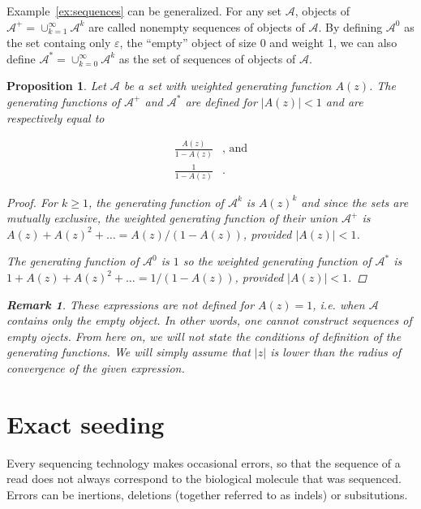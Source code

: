 \documentclass{article}
\newtheorem{proposition}{Proposition}
\newtheorem{remark}{Remark}
\begin{document}
Example~\ref{ex:sequences} can be generalized. For any set $\mathcal{A}$,
objects of $\mathcal{A}^+ = \cup_{k=1}^\infty\mathcal{A}^k$ are called
nonempty sequences of objects of $\mathcal{A}$. By defining
$\mathcal{A}^0$ as the set containg only $\varepsilon$, the ``empty''
object of size 0 and weight 1, we can also define $\mathcal{A}^* =
\cup_{k=0}^\infty\mathcal{A}^k$ as the set of sequences of objects of
$\mathcal{A}$.

\begin{proposition}
Let $\mathcal{A}$ be a set with weighted generating function $A(z)$. The
generating functions of $\mathcal{A}^+$ and $\mathcal{A}^*$ are defined
for $|A(z)| < 1$ and are respectively equal to

\begin{equation*}
\begin{split}
\frac{A(z)}{1-A(z)}&\text{, and} \\
\frac{1}{1-A(z)}&.
\end{split}
\end{equation*}

\begin{proof}
For $k \geq 1$, the generating function of $\mathcal{A}^k$ is $A(z)^k$ and
since the sets are mutually exclusive, the weighted generating function of
their union $\mathcal{A}^+$ is $A(z) + A(z)^2 + \ldots = A(z) / (1-A(z))$,
provided $|A(z)| < 1$.

The generating function of $\mathcal{A}^0$ is $1$ so the weighted
generating function of $\mathcal{A}^*$ is $1 + A(z) + A(z)^2 + \ldots =
1 / (1-A(z))$, provided $|A(z)| < 1$.
\end{proof}

\begin{remark}
These expressions are not defined for $A(z) = 1$, \textit{i.e.} when
$\mathcal{A}$ contains only the empty object. In other words, one cannot
construct sequences of empty ojects. From here on, we will not state the
conditions of definition of the generating functions. We will simply
assume that $|z|$ is lower than the radius of convergence of the given
expression.
\end{remark}

\end{proposition}

\section{Exact seeding}

Every sequencing technology makes occasional errors, so that the sequence
of a read does not always correspond to the biological molecule that was
sequenced. Errors can be inertions, deletions (together referred to as
indels) or subsitutions.
\end{document}
